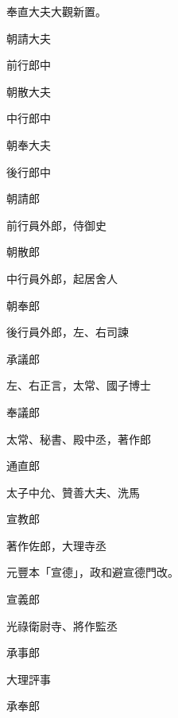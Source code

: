 \begin{pinyinscope}
 奉直大夫大觀新置。



 朝請大夫



 前行郎中



 朝散大夫



 中行郎中



 朝奉大夫



 後行郎中



 朝請郎



 前行員外郎，侍御史



 朝散郎



 中行員外郎，起居舍人



 朝奉郎



 後行員外郎，左、右司諫



 承議郎



 左、右正言，太常、國子博士



 奉議郎



 太常、秘書、殿中丞，著作郎



 通直郎



 太子中允、贊善大夫、洗馬



 宣教郎



 著作佐郎，大理寺丞



 元豐本「宣德」，政和避宣德門改。



 宣義郎



 光祿衛尉寺、將作監丞



 承事郎



 大理評事



 承奉郎




\end{pinyinscope}
